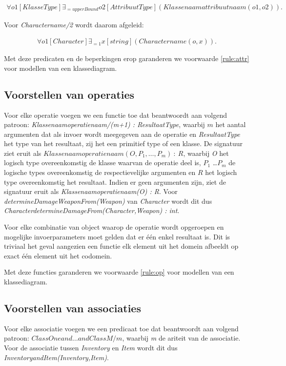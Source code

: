 \begin{align*}
	\forall{o1}[KlasseType] \exists_{=upperBound}{o2}[AttribuutType](Klassenaamattribuutnaam(o1,o2)).
\end{align*}
	
Voor \textit{Charactername/2} wordt daarom afgeleid:
	
\begin{align*}
	\forall{o1}[Character]\exists_{=1}{x}[string](Charactername(o,x)).
\end{align*}

Met deze predicaten en de beperkingen erop garanderen we voorwaarde \ref{rule:attr} voor modellen van een klassediagram.

\subsection{Voorstellen van operaties}\label{sec:cons-method}
Voor elke operatie voegen we een functie toe dat beantwoordt aan volgend patroon: \sloppy
	 \textit{Klassenaamoperatienaam/(m+1) : ResultaatType}, waarbij $m$ het aantal argumenten dat als invoer wordt meegegeven aan de operatie en \textit{ResultaatType} het type van het resultaat, zij het een primitief type of een klasse. De signatuur ziet eruit als \textit{$Klassenaamoperatienaam(O,P_1,\ldots,P_m)\ :\ R$}, waarbij \textit{O} het logisch type overeenkomstig de klasse waarvan de operatie deel is, \textit{$P_1$} \ldots \textit{$P_m$} de logische types overeenkomstig de respectievelijke argumenten en \textit{$R$} het logisch type overeenkomstig het resultaat. Indien er geen argumenten zijn, ziet de signatuur eruit als \textit{Klassenaamoperatienaam(O) : R}. Voor \textit{determineDamageWeaponFrom(Weapon)} van \textit{Character} wordt dit dus \textit{CharacterdetermineDamageFrom(Character,Weapon) : int}.

Voor elke combinatie van object waarop de operatie wordt opgeroepen en mogelijke invoerparameters moet gelden dat er \'e\'en enkel resultaat is. Dit is triviaal het geval aangezien een functie elk element uit het domein afbeeldt op exact \'e\'en element uit het codomein.

Met deze functies garanderen we voorwaarde \ref{rule:op} voor modellen van een klassediagram.

\subsection{Voorstellen van associaties}
Voor elke associatie voegen we een predicaat toe dat beantwoordt aan volgend patroon: \textit{$ClassOneand\ldots{}andClassM/m$}, waarbij \textit{m} de ariteit van de associatie. Voor de associatie tussen \textit{Inventory} en \textit{Item} wordt dit dus \textit{InventoryandItem(Inventory,Item)}.

